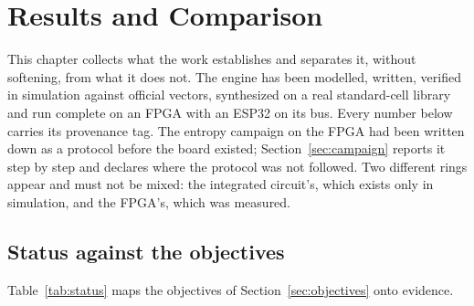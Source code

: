 \chapter{Results and Comparison}
\label{ch:ch7_results}

This chapter collects what the work establishes and separates it, without
softening, from what it does not. The engine has been modelled, written,
verified in simulation against official vectors, synthesized on a real
standard-cell library and run complete on an \ac{FPGA} with an ESP32 on
its bus. Every number below carries its provenance tag. The entropy
campaign on the \ac{FPGA} had been written down as a protocol before the
board existed; Section~\ref{sec:campaign} reports it step by step and
declares where the protocol was not followed. Two different rings appear
and must not be mixed: the integrated circuit's, which exists only in
simulation, and the \ac{FPGA}'s, which was measured.

\section{Status against the objectives}
\label{sec:status}

Table~\ref{tab:status} maps the objectives of
Section~\ref{sec:objectives} onto evidence.

